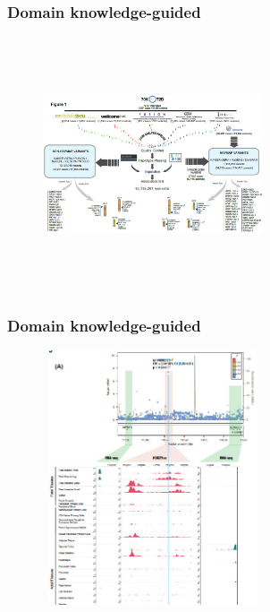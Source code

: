 \documentclass[10pt,xcolor=dvipsnames]{beamer}\usepackage[]{graphicx}\usepackage[]{color}
\begin{document}
\begin{frame}\frametitle{Domain knowledge-guided}

\begin{figure}
  \includegraphics[height=7.5cm, width=6.5cm]{figures/t2d.jpg}
\end{figure}

\end{frame}



\begin{frame}\frametitle{Domain knowledge-guided}

\begin{figure}
  \includegraphics[height=7.5cm, width=6.5cm]{figures/t2d_roadmap.jpg}
\end{figure}

\end{frame}
\end{document}
